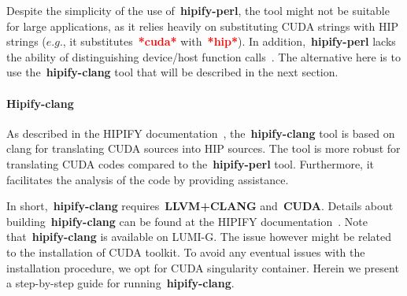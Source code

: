 \par
Despite the simplicity of the use of~\textbf{hipify-perl}, the tool might not be suitable for large applications, as it relies heavily on substituting CUDA strings with HIP strings ($e.g.$, it substitutes~\textbf{\textcolor{red}{*cuda*}} with~\textbf{\textcolor{red}{*hip*}}).
In addition,~\textbf{hipify-perl} lacks the ability of distinguishing device/host function calls~\cite{hipify}.
The alternative here is to use the~\textbf{hipify-clang} tool that will be described in the next section.


\paragraph{Hipify-clang}


\par
As described in the HIPIFY documentation~\cite{hipify}, the~\textbf{hipify-clang} tool is based on clang for translating CUDA sources into HIP sources.
The tool is more robust for translating CUDA codes compared to the~\textbf{hipify-perl} tool.
Furthermore, it facilitates the analysis of the code by providing assistance.


\par
In short,~\textbf{hipify-clang} requires~\textbf{LLVM+CLANG} and~\textbf{CUDA}.
Details about building~\textbf{hipify-clang} can be found at the HIPIFY documentation~\cite{hipify}.
Note that~\textbf{hipify-clang} is available on LUMI-G.
The issue however might be related to the installation of CUDA toolkit.
To avoid any eventual issues with the installation procedure, we opt for CUDA singularity container.
Herein we present a step-by-step guide for running~\textbf{hipify-clang}.



